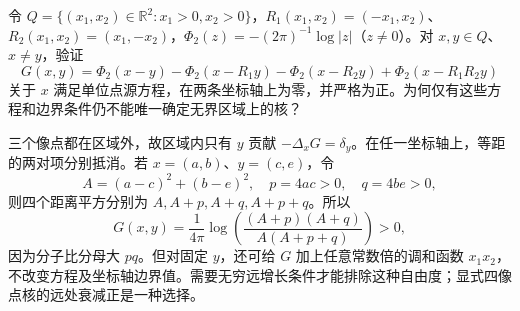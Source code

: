 \begin{optionalexercise}\label{b2:ex:13-quadrant-images}
令 \(Q=\{(x_1,x_2)\in\mathbb R^2:x_1>0,x_2>0\}\)，\(R_1(x_1,x_2)=(-x_1,x_2)\)、\(R_2(x_1,x_2)=(x_1,-x_2)\)，\(\Phi_2(z)=-(2\pi)^{-1}\log|z|\)（\(z\ne0\)）。对 \(x,y\in Q\)、\(x\ne y\)，验证
\[
 G(x,y)=\Phi_2(x-y)-\Phi_2(x-R_1y)-\Phi_2(x-R_2y)+\Phi_2(x-R_1R_2y)
\]
关于 \(x\) 满足单位点源方程，在两条坐标轴上为零，并严格为正。为何仅有这些方程和边界条件仍不能唯一确定无界区域上的核？
\end{optionalexercise}
\begin{solution}
三个像点都在区域外，故区域内只有 \(y\) 贡献 \(-\Delta_xG=\delta_y\)。在任一坐标轴上，等距的两对项分别抵消。若 \(x=(a,b)\)、\(y=(c,e)\)，令
\[
 A=(a-c)^2+(b-e)^2,\quad p=4ac>0,\quad q=4be>0,
\]
则四个距离平方分别为 \(A,A+p,A+q,A+p+q\)。所以
\[
 G(x,y)=\dfrac1{4\pi}\log
 \left(\dfrac{(A+p)(A+q)}{A(A+p+q)}\right)>0,
\]
因为分子比分母大 \(pq\)。但对固定 \(y\)，还可给 \(G\) 加上任意常数倍的调和函数 \(x_1x_2\)，不改变方程及坐标轴边界值。需要无穷远增长条件才能排除这种自由度；显式四像点核的远处衰减正是一种选择。
\end{solution}

